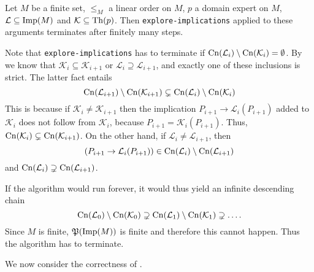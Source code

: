 \begin{Theorem}
  \label{thm:explore-implications-termination}
  Let $M$ be a finite set, $\leq_M$ a linear order on $M$, $p$ a domain expert on $M$,
  $\mathcal{L} \subseteq \operatorname{Imp}(M)$ and $\mathcal{K} \subseteq \operatorname{Th}(p)$.  Then
  \lstinline{explore-implications} applied to these arguments terminates after finitely
  many steps.
\end{Theorem}
\begin{Proof}
  Note that \lstinline{explore-implications} has to terminate if $\operatorname{Cn}(\mathcal{L}_i)
  \setminus \operatorname{Cn}(\mathcal{K}_i) = \emptyset$.  By
   we know that $\mathcal{K}_i
  \subseteq \mathcal{K}_{i+1}$ or $\mathcal{L}_i \supseteq \mathcal{L}_{i+1}$, and exactly
  one of these inclusions is strict.  The latter fact entails
  \begin{equation}
    \label{eq:36}
    \operatorname{Cn}(\mathcal{L}_{i+1}) \setminus \operatorname{Cn}(\mathcal{K}_{i+1}) \subsetneq \operatorname{Cn}(\mathcal{L}_i)
    \setminus \operatorname{Cn}(\mathcal{K}_i)
  \end{equation}
  This is because if $\mathcal{K}_i \neq \mathcal{K}_{i+1}$ then the implication $P_{i+1}
  \to \mathcal{L}_i(P_{i+1})$ added to $\mathcal{K}_{i}$ does not follow from
  $\mathcal{K}_i$, because $P_{i+1} = \mathcal{K}_{i}(P_{i+1})$.  Thus,
  $\operatorname{Cn}(\mathcal{K}_i) \subsetneq \operatorname{Cn}(\mathcal{K}_{i+1})$.  On the other hand, if
  $\mathcal{L}_i \neq \mathcal{L}_{i+1}$, then
  \begin{equation*}
    (P_{i+1} \to \mathcal{L}_i(P_{i+1})) \in \operatorname{Cn}(\mathcal{L}_i) \setminus \operatorname{Cn}(\mathcal{L}_{i+1})
  \end{equation*}
  and $\operatorname{Cn}(\mathcal{L}_i) \supsetneq \operatorname{Cn}(\mathcal{L}_{i+1})$.

  If the algorithm would run forever, it would thus yield an infinite descending chain
  \begin{equation*}
    \operatorname{Cn}(\mathcal{L}_0) \setminus \operatorname{Cn}(\mathcal{K}_0) \supsetneq \operatorname{Cn}(\mathcal{L}_1)
    \setminus \operatorname{Cn}(\mathcal{K}_1) \supsetneq \dots.
  \end{equation*}
  Since $M$ is finite, ${\mathfrak{P}(\operatorname{Imp}(M))}$ is finite and therefore this cannot happen.
  Thus the algorithm has to terminate.
\end{Proof}

We now consider the correctness of .

